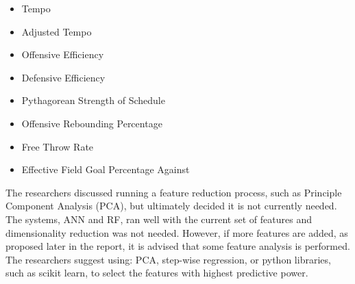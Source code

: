 \documentclass[conference]{IEEEtran}
\begin{document}
\begin{itemize}
  \item Tempo
  \item Adjusted Tempo
  \item Offensive Efficiency
  \item Defensive Efficiency
  \item Pythagorean Strength of Schedule
  \item Offensive Rebounding Percentage
  \item Free Throw Rate
  \item Effective Field Goal Percentage Against
\end{itemize}


The researchers discussed running a feature reduction process, such as Principle Component Analysis (PCA), but ultimately decided it is not currently needed. The systems, ANN and RF, ran well with the current set of features and dimensionality reduction was not needed. However, if more features are added, as proposed later in the report, it is advised that some feature analysis is performed. The researchers suggest using: PCA, step-wise regression, or python libraries, such as scikit learn, to select the features with highest predictive power.
\end{document}

